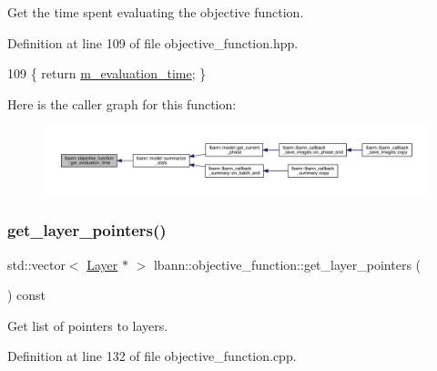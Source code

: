 Get the time spent evaluating the objective function. 

Definition at line 109 of file objective\+\_\+function.\+hpp.


\begin{DoxyCode}
109 \{ \textcolor{keywordflow}{return} \hyperlink{classlbann_1_1objective__function_a9ef17c7204cd371261c9c083d86de91a}{m\_evaluation\_time}; \}
\end{DoxyCode}
Here is the caller graph for this function\+:\nopagebreak
\begin{figure}[H]
\begin{center}
\leavevmode
\includegraphics[width=350pt]{classlbann_1_1objective__function_a4a23b4c51fe61584c97a471d28f7b8d7_icgraph}
\end{center}
\end{figure}
\mbox{\label{classlbann_1_1objective__function_a1055da2236a7faf79c5a2632f8dfc683}} 
\subsubsection{\texorpdfstring{get\+\_\+layer\+\_\+pointers()}{get\_layer\_pointers()}}
{\footnotesize\ttfamily std\+::vector$<$ \hyperlink{classlbann_1_1Layer}{Layer} $\ast$ $>$ lbann\+::objective\+\_\+function\+::get\+\_\+layer\+\_\+pointers (\begin{DoxyParamCaption}{ }\end{DoxyParamCaption}) const}

Get list of pointers to layers. 

Definition at line 132 of file objective\+\_\+function.\+cpp.


